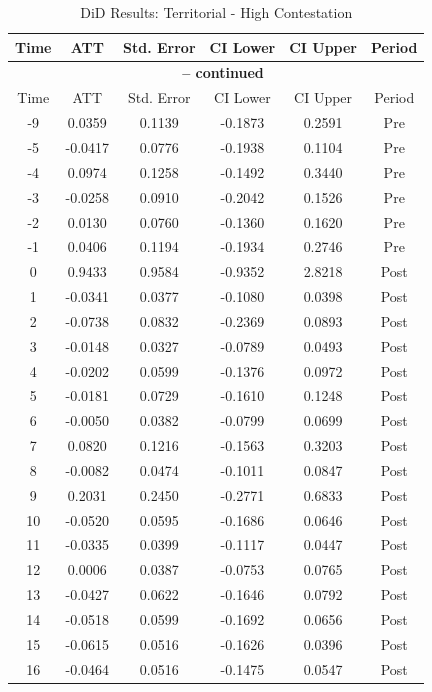 \documentclass[bibtex]{article}
\begin{document}
{\begin{longtable}{cccccc}
\caption{DiD Results: Territorial - High Contestation} \label{tab:terr_high} \\
\toprule
Time & ATT & Std. Error & CI Lower & CI Upper & Period \\
\midrule
\endfirsthead
\multicolumn{6}{c}{{\bfseries \tablename\ \thetable{} -- continued}} \\
\toprule
Time & ATT & Std. Error & CI Lower & CI Upper & Period \\
\midrule
\endhead
-9 & 0.0359 & 0.1139 & -0.1873 & 0.2591 & Pre \\
-5 & -0.0417 & 0.0776 & -0.1938 & 0.1104 & Pre \\
-4 & 0.0974 & 0.1258 & -0.1492 & 0.3440 & Pre \\
-3 & -0.0258 & 0.0910 & -0.2042 & 0.1526 & Pre \\
-2 & 0.0130 & 0.0760 & -0.1360 & 0.1620 & Pre \\
-1 & 0.0406 & 0.1194 & -0.1934 & 0.2746 & Pre \\
0 & 0.9433 & 0.9584 & -0.9352 & 2.8218 & Post \\
1 & -0.0341 & 0.0377 & -0.1080 & 0.0398 & Post \\
2 & -0.0738 & 0.0832 & -0.2369 & 0.0893 & Post \\
3 & -0.0148 & 0.0327 & -0.0789 & 0.0493 & Post \\
4 & -0.0202 & 0.0599 & -0.1376 & 0.0972 & Post \\
5 & -0.0181 & 0.0729 & -0.1610 & 0.1248 & Post \\
6 & -0.0050 & 0.0382 & -0.0799 & 0.0699 & Post \\
7 & 0.0820 & 0.1216 & -0.1563 & 0.3203 & Post \\
8 & -0.0082 & 0.0474 & -0.1011 & 0.0847 & Post \\
9 & 0.2031 & 0.2450 & -0.2771 & 0.6833 & Post \\
10 & -0.0520 & 0.0595 & -0.1686 & 0.0646 & Post \\
11 & -0.0335 & 0.0399 & -0.1117 & 0.0447 & Post \\
12 & 0.0006 & 0.0387 & -0.0753 & 0.0765 & Post \\
13 & -0.0427 & 0.0622 & -0.1646 & 0.0792 & Post \\
14 & -0.0518 & 0.0599 & -0.1692 & 0.0656 & Post \\
15 & -0.0615 & 0.0516 & -0.1626 & 0.0396 & Post \\
16 & -0.0464 & 0.0516 & -0.1475 & 0.0547 & Post \\

\end{longtable}}
\end{document}
